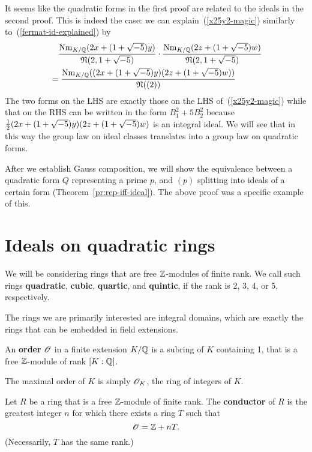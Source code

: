 It seems like the quadratic forms in the first proof are related to the ideals in the second proof. This is indeed the case: we can explain~(\ref{x25y2-magic}) similarly to~(\ref{fermat-id-explained}) by
\begin{align*}
&\quad \frac{\operatorname{Nm}_{K/\mathbb{Q}}(2x+(1+\sqrt{-5})y)}{\mathfrak N (2,1+\sqrt{-5})}\cdot \frac{\operatorname{Nm}_{K/\mathbb{Q}}(2z+(1+\sqrt{-5})w)}{\mathfrak N(2,1+\sqrt{-5})}\\
&=\frac{\operatorname{Nm}_{K/\mathbb{Q}}((2x+(1+\sqrt{-5})y)(2z+(1+\sqrt{-5})w))}
{\mathfrak N((2))}
\end{align*}
The two forms on the LHS are exactly those on the LHS of~(\ref{x25y2-magic}) while that on the RHS can be written in the form $B_1^2+5B_2^2$ because $\frac{1}{2}(2x+(1+\sqrt{-5})y)(2z+(1+\sqrt{-5})w)$ is an integral ideal. We will see that in this way the group law on ideal classes translates into a group law on quadratic forms.

After we establish Gauss composition, we will show the equivalence between a quadratic form $Q$ representing a prime $p$, and $(p)$ splitting into ideals of a certain form (Theorem~\ref{pr:rep-iff-ideal}). The above proof was a specific example of this.
\section{Ideals on quadratic rings}
\begin{df}
We will be considering rings that are free $\mathbb{Z}$-modules of finite rank. We call such rings \textbf{quadratic}, \textbf{cubic}, \textbf{quartic}, and \textbf{quintic}, if the rank is 2, 3, 4, or 5, respectively.
\end{df}
The rings we are primarily interested are integral domains, which are exactly the rings that can be embedded in field extensions.
\begin{df}
An \textbf{order} $\mathscr{O}$ in a finite extension $K/\mathbb{Q}$ is a subring of $K$ containing 1, that is a free $\mathbb{Z}$-module of rank $[K:\mathbb{Q}]$.
\end{df}
The maximal order of $K$ is simply $\mathscr{O}_K$, the ring of integers of $K$.
\begin{df}
Let $R$ be a ring that is a free $\mathbb{Z}$-module of finite rank. 
The \textbf{conductor} of $R$ is the greatest integer $n$ for which there exists a ring $T$ such that
\[
\mathscr{O}=\mathbb{Z}+nT.
\]
(Necessarily, $T$ has the same rank.)
\end{df}

